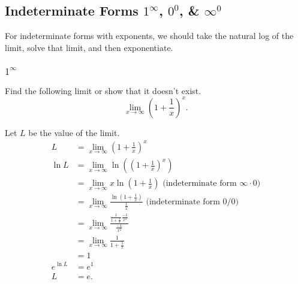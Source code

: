 \subsection{Indeterminate Forms $1^\infty$, $0^0$, \& $\infty^0$}
For indeterminate forms with exponents, we should take the natural log of the limit, solve that limit, and then exponentiate.

\subsubsection{$1^\infty$}
\begin{example}
	Find the following limit or show that it doesn't exist.
	\begin{equation*}
		\lim_{x\to \infty}{\left(1+\frac{1}{x}\right)^x}.
	\end{equation*}
\end{example}
\begin{answer}
	Let $L$ be the value of the limit.
	\begin{align*}
		L &= \lim_{x\to \infty}{\left(1+\frac{1}{x}\right)^x} \\
		\ln{L} &= \lim_{x\to\infty}{\ln{\left(\left(1+\frac{1}{x}\right)^x\right)}} \\
		&= \lim_{x\to\infty}{x\ln{\left(1+\frac{1}{x}\right)}} \text{ (indeterminate form $\infty\cdot 0$)} \\
		&= \lim_{x\to\infty}{\frac{\ln{\left(1+\frac{1}{x}\right)}}{\frac{1}{x}}} \text{ (indeterminate form $0/0$)} \\
		&= \lim_{x\to\infty}{\frac{\frac{1}{1+\frac{1}{x}}\frac{-1}{x^2}}{\frac{-1}{x^2}}} \\
		&= \lim_{x\to\infty}{\frac{1}{1+\frac{1}{x}}} \\
		&= 1 \\
		e^{\ln{L}} &= e^1 \\
		L &= e.
	\end{align*}
\end{answer}


